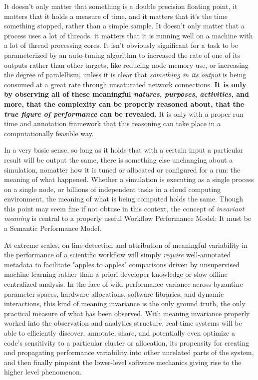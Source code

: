 It doesn't only matter that something is a double precision floating
point, it matters that it holds a measure of time, and it matters that
it's the time something stopped, rather than a simple sample.  It
doesn't only matter that a process uses a lot of threads, it matters
that it is running well on a machine with a lot of thread processing
cores. It isn't obviously significant for a task to be parameterized
by an auto-tuning algorithm to increased the rate of one of its
outputs rather than other targets, like reducing node memory use, or
increasing the degree of paralellism, unless it is clear that
\textit{something in its output} is being consumed at a great rate
through unsaturated network connections. \textbf{It is only by
  observing all of these meaningful \textit{natures},
  \textit{purposes}, \textit{activities}, and more, that the
  complexity can be properly reasoned about, that the \textit{true
    figure of performance} can be revealed.} It is only with a proper
run-time and annotation framework that this reasoning can take place
in a computationally feasible way.

In a very basic sense, so long as it holds that with a certain input a
particular result will be output the same, there is something else
unchanging about a simulation, nomatter how it is tuned or allocated
or configured for a run: the meaning of what happened.  Whether a
simulation is executing as a single process on a single node, or
billions of independent tasks in a cloud computing environment, the
meaning of what is being computed holds the same. Though this point
may seem fine if not obtuse in this context, the concept of
\textit{invariant meaning} is central to a properly useful Workflow
Performance Model: It must be a Semantic Performance Model.

At extreme scales, on line detection and attribution of meaningful
variability in the performance of a scientific workflow will simply
\textit{require} well-annotated metadata to facilitate "apples to
apples" comparisons driven by unsupervised machine learning rather
than a priori developer knowledge or slow offline centralized
analysis. In the face of wild performance variance across byzantine
parameter spaces, hardware allocations, software libraries, and
dynamic interactions, this kind of meaning invariance is the only
ground truth, the only practical measure of what has been
observed. With meaning invariance properly worked into the observation
and analytics structure, real-time systems will be able to efficiently
discover, annotate, share, and potentially even optimize a code's
sensitivity to a particular cluster or allocation, its propensity for
creating and propagating performance variability into other unrelated
parts of the system, and then finally pinpoint the lower-level
software mechanics giving rise to the higher level phenomenon.


